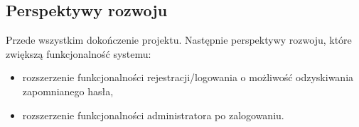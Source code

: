 \documentclass[12pt,a4paper]{article}
\begin{document}
	\subsection{Perspektywy rozwoju}
	\par Przede wszystkim dokończenie projektu. Następnie perspektywy rozwoju, które zwiększą funkcjonalność systemu:
	\begin{itemize}
		\item rozszerzenie funkcjonalności rejestracji/logowania o możliwość odzyskiwania zapomnianego hasła,
		\item rozszerzenie funkcjonalności administratora po zalogowaniu.
	\end{itemize}
	
	
\end{document}
